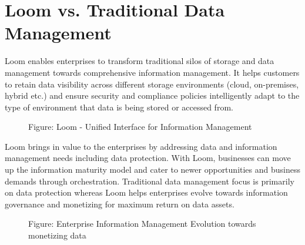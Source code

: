 \documentclass[letterpaper,10pt,english]{sphinxmanual}
\begin{document}
\section{Loom vs. Traditional Data Management}
\label{\detokenize{loom_getting_started_guide:loom-vs-traditional-data-management}}
Loom enables enterprises to transform traditional silos of storage and data management towards comprehensive information management. It helps customers to retain data visibility across different storage environments (cloud, on-premises, hybrid etc.) and ensure security and compliance policies intelligently adapt to the type of environment that data is being stored or accessed from.

\begin{figure}[htbp]
\centering
\capstart

\noindent{}
\caption{Figure: Loom - Unified Interface for Information Management}\label{\detokenize{loom_getting_started_guide:id10}}\end{figure}

Loom brings in value to the enterprises by addressing data and information management needs including data protection. With Loom, businesses can move up the information maturity model and cater to newer opportunities and business demands through orchestration. Traditional data management focus is primarily on data protection whereas Loom helps enterprises evolve towards information governance and monetizing for maximum return on data assets.

\begin{figure}[htbp]
\centering
\capstart

\noindent{}
\caption{Figure: Enterprise Information Management Evolution towards monetizing data}\label{\detokenize{loom_getting_started_guide:id11}}\end{figure}
\end{document}
